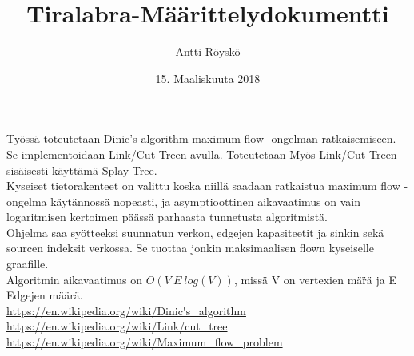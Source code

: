 \documentclass{article}
\title{Tiralabra-M\"a\"arittelydokumentti}
\author{Antti R\"oysk\"o}
\date{15. Maaliskuuta 2018}
\begin{document}
\maketitle

\noindent
Ty\"oss\"a toteutetaan Dinic's algorithm maximum flow -ongelman ratkaisemiseen. Se implementoidaan Link/Cut Treen avulla. Toteutetaan My\"os Link/Cut Treen sis\"aisesti k\"aytt\"am\"a Splay Tree. \\

\noindent
Kyseiset tietorakenteet on valittu koska niill\"a saadaan ratkaistua maximum flow -ongelma k\"ayt\"annoss\"a nopeasti, ja asymptioottinen aikavaatimus on vain logaritmisen kertoimen p\"a\"ass\"a parhaasta tunnetusta algoritmist\"a. \\

\noindent
Ohjelma saa sy\"otteeksi suunnatun verkon, edgejen kapasiteetit ja sinkin sek\"a sourcen indeksit verkossa. Se tuottaa jonkin maksimaalisen flown kyseiselle graafille.\\

\noindent
Algoritmin aikavaatimus on $O(V\ E\ log(V))$, miss\"a V on vertexien m\"a\"r\"a ja E Edgejen m\"a\"ar\"a.\\

\noindent
\url{https://en.wikipedia.org/wiki/Dinic's_algorithm}\\
\url{https://en.wikipedia.org/wiki/Link/cut_tree}\\
\url{https://en.wikipedia.org/wiki/Maximum_flow_problem}\\
\end{document}
